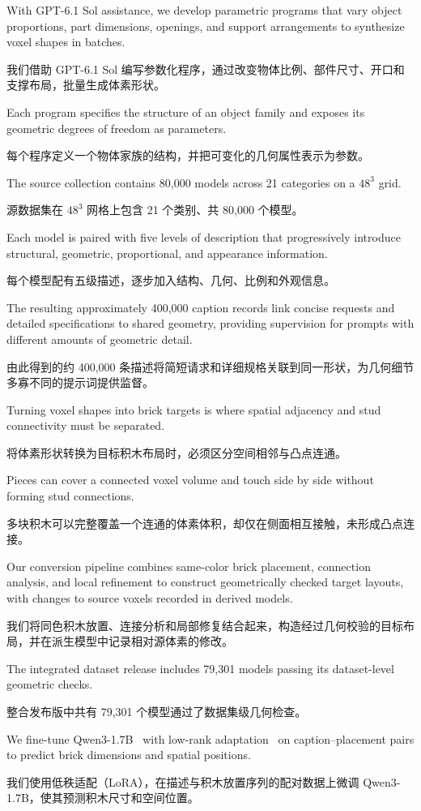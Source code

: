 \documentclass[11pt,letterpaper]{article}
\let\cite\citep
\newcommand{\pair}[2]{\par\addvspace{4pt}\noindent
  \begin{minipage}{\linewidth}\raggedright
  #1\par\nobreak\vspace{1pt}
  {\color{translation}\chinesefont\fontsize{10.5}{15.3}\selectfont #2\par}
  \end{minipage}\par}
\begin{document}
\pair{With GPT-6.1 Sol assistance, we develop parametric programs that vary object proportions, part dimensions, openings, and support arrangements to synthesize voxel shapes in batches.}{我们借助 GPT-6.1 Sol 编写参数化程序，通过改变物体比例、部件尺寸、开口和支撑布局，批量生成体素形状。}

\pair{Each program specifies the structure of an object family and exposes its geometric degrees of freedom as parameters.}{每个程序定义一个物体家族的结构，并把可变化的几何属性表示为参数。}

\pair{The source collection contains 80,000 models across 21 categories on a $48^3$ grid.}{源数据集在 $48^3$ 网格上包含 21 个类别、共 80,000 个模型。}

\pair{Each model is paired with five levels of description that progressively introduce structural, geometric, proportional, and appearance information.}{每个模型配有五级描述，逐步加入结构、几何、比例和外观信息。}

\pair{The resulting approximately 400,000 caption records link concise requests and detailed specifications to shared geometry, providing supervision for prompts with different amounts of geometric detail.}{由此得到的约 400,000 条描述将简短请求和详细规格关联到同一形状，为几何细节多寡不同的提示词提供监督。}

\pair{Turning voxel shapes into brick targets is where spatial adjacency and stud connectivity must be separated.}{将体素形状转换为目标积木布局时，必须区分空间相邻与凸点连通。}

\pair{Pieces can cover a connected voxel volume and touch side by side without forming stud connections.}{多块积木可以完整覆盖一个连通的体素体积，却仅在侧面相互接触，未形成凸点连接。}

\pair{Our conversion pipeline combines same-color brick placement, connection analysis, and local refinement to construct geometrically checked target layouts, with changes to source voxels recorded in derived models.}{我们将同色积木放置、连接分析和局部修复结合起来，构造经过几何校验的目标布局，并在派生模型中记录相对源体素的修改。}

\pair{The integrated dataset release includes 79,301 models passing its dataset-level geometric checks.}{整合发布版中共有 79,301 个模型通过了数据集级几何检查。}

\pair{We fine-tune Qwen3-1.7B~\cite{qwen3} with low-rank adaptation~\cite{lora} on caption--placement pairs to predict brick dimensions and spatial positions.}{我们使用低秩适配（LoRA），在描述与积木放置序列的配对数据上微调 Qwen3-1.7B，使其预测积木尺寸和空间位置。}
\end{document}
